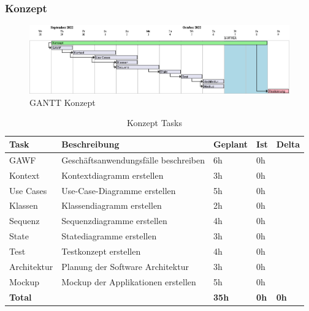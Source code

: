   
  \subsubsection{Konzept}
  \begin{figure}[H]
    \begin{center}
      \includegraphics[width=1\linewidth]{../content/diagrams/gantt/conceptPlanning/roughtPlanning.png}
      \caption{GANTT Konzept }
    \end{center}
  \end{figure}
  \begin{table}[H]
    \centering
    \settowidth{}
    \setlength\extrarowheight{2pt}
    \begin{tabulary}{1.0\textwidth}{|L|L|L|L|L|}
      \hline
      \textbf{Task} &
      \textbf{Beschreibung} &
      \textbf{Geplant}&
      \textbf{Ist}&
      \textbf{Delta}\\
      \hline
      GAWF &
      Geschäftsanwendungsfälle beschreiben &
      6h &
      0h &
      \\
      \hline
      Kontext &
      Kontextdiagramm erstellen &
      3h &
      0h &
      \\
      \hline
      Use Cases &
      Use-Case-Diagramme erstellen&
      5h &
      0h &
      \\
      \hline
      Klassen &
      Klassendiagramm erstellen &
      2h &
      0h &
      \\
      \hline
      Sequenz &
      Sequenzdiagramme erstellen &
      4h &
      0h &
      \\
      \hline
      State &
      Statediagramme erstellen &
      3h &
      0h &
      \\
      \hline
      Test &
      Testkonzept erstellen &
      4h &
      0h &
      \\
      \hline
      Architektur &
      Planung der Software Architektur &
      3h &
      0h &
      \\
      \hline
      Mockup&
      Mockup der Applikationen erstellen &
      5h &
      0h &
      \\
      \hline
      \textbf{Total} &
       &
      \textbf{35h} &
      \textbf{0h}&
      \textbf{0h} \\
      \hline
    \end{tabulary}
    \caption{Konzept Tasks}
  \end{table}

